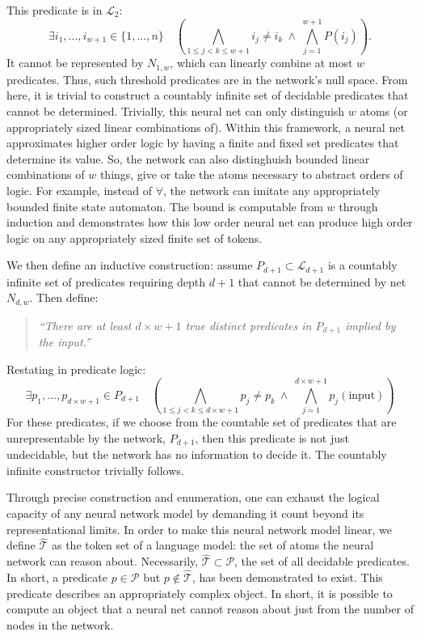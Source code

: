 \documentclass[12pt]{article}
\theoremstyle{plain}
\begin{document}
This predicate is in $\mathcal{L}_2$: 
$$
    \exists i_1, \dots, i_{w+1} \in \{1, \dots, n\} \quad
    \left(
    \bigwedge_{1 \leq j < k \leq w+1} i_j \neq i_k \ \wedge\
    \bigwedge_{j=1}^{w+1} P(i_j)
    \right).
$$
It cannot be represented by $N_{1,w}$, which can linearly combine at most 
$w$ predicates. Thus, such threshold predicates are in the network's null 
space.  From here, it is trivial to construct a countably infinite set
of decidable predicates that cannot be determined.  Trivially, this neural
net can only distinguish $w$ atoms (or appropriately sized linear combinations
of).  Within this framework, a neural net approximates higher order logic
by having a finite and fixed set predicates that determine its value.
So, the network can also distinghuish bounded linear combinations of $w$
things, give or take the atoms necessary to abstract orders of logic.
For example, instead of $\forall$, the network can imitate any appropriately
bounded finite state automaton.  The bound is computable from $w$ through
induction and demonstrates how this low order neural net can produce
high order logic on any appropriately sized finite set of tokens.

We then define an inductive construction: assume $P_{d+1} \subset 
\mathcal{L}_{d+1}$ is a countably infinite set of predicates requiring depth 
$d+1$ that cannot be determined by net $N_{d,w}$. Then define:
\begin{quote}
\emph{``There are at least $d \times w + 1$ true distinct predicates in $P_{d+1}$ implied by the input.''}
\end{quote}
Restating in predicate logic:
$$
    \exists p_1, \dots, p_{d \times w + 1} \in P_{d+1} \quad
    \left(
    \bigwedge_{1 \leq j < k \leq d \times w + 1} p_j \neq p_k \ \wedge\
    \bigwedge_{j=1}^{d \times w + 1} p_j(\text{input})
    \right)
$$
For these predicates, if we choose from the countable set of predicates that
are unrepresentable by the network, $P_{d+1}$, then this predicate is not
just undecidable, but the network has no information to decide it. The
countably infinite constructor trivially follows.

Through precise construction and enumeration, one can exhaust the logical capacity
of any neural network model by demanding it count beyond its representational limits.
In order to make this neural network model linear, we define $\hat{\mathcal{T}}$ as 
the token set of a language model: the set of atoms the neural network can reason about. 
Necessarily,
$\hat{\mathcal{T}}\subset \mathcal{P}$, the set of all decidable predicates.  In short,
a predicate $p\in \mathcal{P}$ but $p \notin \hat{\mathcal{T}}$, has been
demonstrated to exist.  This predicate describes an appropriately complex object. 
In short, it is possible to compute an object that a neural net cannot reason about
just from the number of nodes in the network.
\end{document}
